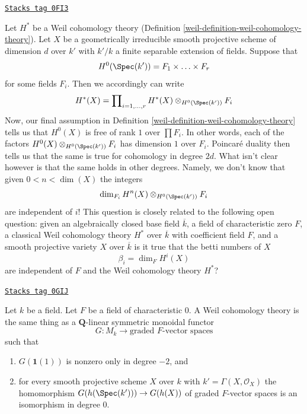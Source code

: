 \begin{remark}
\label{weil-remark-betti-numbers-in-some-sense}
\href{https://stacks.math.columbia.edu/tag/0FI3}{\texttt{Stacks tag 0FI3}}

Let $H^*$ be a Weil cohomology theory
(Definition \ref{weil-definition-weil-cohomology-theory}).
Let $X$ be a geometrically irreducible smooth projective scheme
of dimension $d$ over $k'$ with $k'/k$ a finite separable extension of fields.
Suppose that
$$
H^0(\Spec(k')) = F_1 \times \ldots \times F_r
$$
for some fields $F_i$. Then we accordingly can write
$$
H^*(X) = \prod\nolimits_{i = 1, \ldots, r}
H^*(X) \otimes_{H^0(\Spec(k'))} F_i
$$
Now, our final assumption in Definition \ref{weil-definition-weil-cohomology-theory}
tells us that $H^0(X)$ is free of rank $1$ over $\prod F_i$.
In other words, each of the factors
$H^0(X) \otimes_{H^0(\Spec(k'))} F_i$ has dimension $1$ over $F_i$.
Poincar\'e duality then tells us that the same is true for
cohomology in degree $2d$.
What isn't clear however is that the same holds in other degrees.
Namely, we don't know that given $0 < n < \dim(X)$ the integers
$$
\dim_{F_i} H^n(X) \otimes_{H^0(\Spec(k'))} F_i
$$
are independent of $i$! This question is closely related to the following
open question: given an algebraically closed base field $\overline{k}$,
a field of characteristic zero $F$, a classical Weil cohomology theory
$H^*$ over $\overline{k}$ with coefficient field $F$, and a smooth projective
variety $X$ over $\overline{k}$ is it true that the betti numbers of $X$
$$
\beta_i = \dim_F H^i(X)
$$
are independent of $F$ and the Weil cohomology theory $H^*$?
\end{remark}

\begin{proposition}
\label{weil-proposition-weil-cohomology-theory-again}
\href{https://stacks.math.columbia.edu/tag/0GIJ}{\texttt{Stacks tag 0GIJ}}

Let $k$ be a field. Let $F$ be a field of characteristic $0$.
A Weil cohomology theory is the same thing as a $\mathbf{Q}$-linear
symmetric monoidal functor
$$
G : M_k \longrightarrow \text{graded }F\text{-vector spaces}
$$
such that
\begin{enumerate}
\item $G(\mathbf{1}(1))$ is nonzero only in degree $-2$, and
\item for every smooth projective scheme $X$ over $k$ with
$k' = \Gamma(X, \mathcal{O}_X)$ the homomorphism
$G(h(\Spec(k'))) \to G(h(X))$ of graded $F$-vector spaces
is an isomorphism in degree $0$.
\end{enumerate}
\end{proposition}

